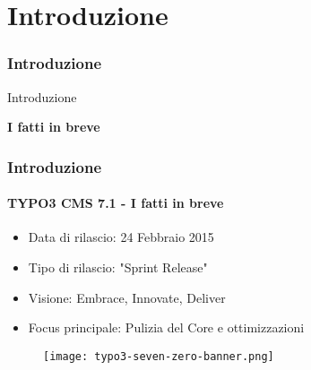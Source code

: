 %

\section{Introduzione}
\begin{frame}[fragile]
	\frametitle{Introduzione}

	\begin{center}\huge{Introduzione}\end{center}
	\begin{center}\huge{\color{typo3darkgrey}\textbf{I fatti in breve}}\end{center}

\end{frame}


\begin{frame}[fragile]
	\frametitle{Introduzione}
	\framesubtitle{TYPO3 CMS 7.1 - I fatti in breve}

	\begin{itemize}
		\item Data di rilascio: 24 Febbraio 2015
		\item Tipo di rilascio: "Sprint Release"
		\item Visione: Embrace, Innovate, Deliver
		\item Focus principale: Pulizia del Core e ottimizzazioni
	\end{itemize}

	\begin{figure}
		\texttt{[image: typo3-seven-zero-banner.png]}
	\end{figure}

\end{frame}


